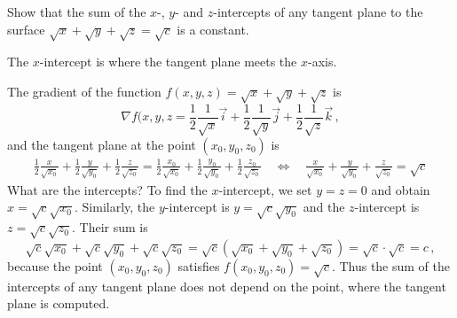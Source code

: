 \begin{question}
Show that the sum of the $x$-, $y$- and $z$-intercepts of any tangent plane to the surface 
$\sqrt x + \sqrt y + \sqrt z = \sqrt c$
is a constant.

\begin{hint*}
The $x$-intercept is where the tangent plane meets the $x$-axis.
\end{hint*}

\begin{solution}
The gradient of the function $f(x,y,z) = \sqrt x + \sqrt y + \sqrt z$ is
\[
\nabla f(x,y,z = \frac 12 \frac 1{\sqrt{x}} \vec i + \frac 12 \frac 1{\sqrt{y}} \vec j
+ \frac 12 \frac 1{\sqrt{z}} \vec k\,,
\]
and the tangent plane at the point $(x_0,y_0,z_0)$ is
\begin{align*}
\frac 12 \frac{x}{\sqrt{x_0}} + \frac 12 \frac{y}{\sqrt{y_0}} 
+ \frac 12 \frac{z}{\sqrt{z_0}} =
\frac 12 \frac{x_0}{\sqrt{x_0}} + \frac 12 \frac{y_0}{\sqrt{y_0}} 
+ \frac 12 \frac{z_0}{\sqrt{z_0}}
\quad\Leftrightarrow\quad
\frac{x}{\sqrt{x_0}} + \frac{y}{\sqrt{y_0}} 
+ \frac{z}{\sqrt{z_0}} = \sqrt c
\end{align*}
What are the intercepts? To find the $x$-intercept, we set $y=z=0$ and obtain $x = \sqrt c \sqrt{x_0}$. Similarly, the $y$-intercept is $y = \sqrt c \sqrt{y_0}$ and the $z$-intercept is $z = \sqrt c \sqrt{z_0}$. Their sum is
\[
\sqrt c \sqrt{x_0} + \sqrt c \sqrt{y_0} + \sqrt c \sqrt{z_0} =
\sqrt c \left(\sqrt{x_0} + \sqrt{y_0} + \sqrt{z_0} \right) = \sqrt c \cdot \sqrt c = c\,,
\]
because the point $(x_0,y_0,z_0)$ satisfies $f(x_0,y_0,z_0) = \sqrt c$. Thus the sum of the intercepts of any tangent plane does not depend on the point, where the tangent plane is computed.
\end{solution}
\end{question}


